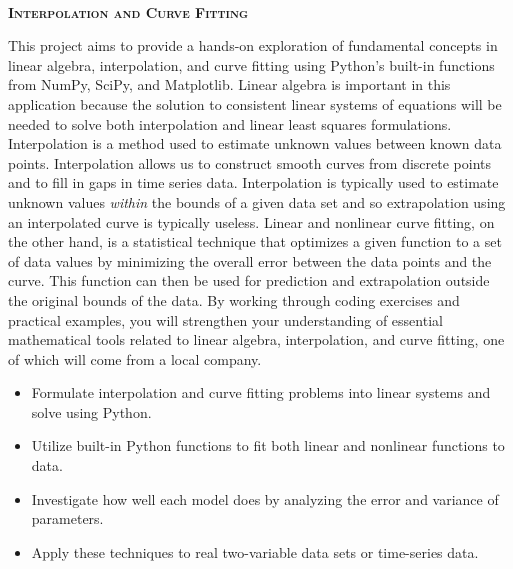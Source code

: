 \documentclass[article, 11pt]{article}
\begin{document}
\begin{center}\\
\Huge{\textbf{\textsc{ Interpolation and Curve Fitting }}} \\ \end{center}

\vspace{.6cm}

\noindent {}

\vspace{-.35cm}
\noindent \hrulefill

This project aims to provide a hands-on exploration of fundamental concepts in linear algebra, interpolation, and curve fitting using Python's built-in functions from NumPy, SciPy, and Matplotlib.  Linear algebra is important in this application because the solution to consistent linear systems of equations will be needed to solve both interpolation and linear least squares formulations.  Interpolation is a method used to estimate unknown values between known data points.  Interpolation allows us to construct smooth curves from discrete points and to fill in gaps in time series data.  Interpolation is typically used to estimate unknown values \textit{within} the bounds of a given data set and so extrapolation using an interpolated curve is typically useless.  Linear and nonlinear curve fitting, on the other hand, is a statistical technique that optimizes a given function to a set of data values by minimizing the overall error between the data points and the curve.  This function can then be used for prediction and extrapolation outside the original bounds of the data.  By working through coding exercises and practical examples, you will strengthen your understanding of essential mathematical tools related to linear algebra, interpolation, and curve fitting, one of which will come from a local company.  \\


\noindent {}

\vspace{-.35cm}
\noindent \hrulefill

\begin{itemize}
	\item Formulate interpolation and curve fitting problems into linear systems and solve using Python.
	\item Utilize built-in Python functions to fit both linear and nonlinear functions to data. 
	\item Investigate how well each model does by analyzing the error and variance of parameters.  
	\item Apply these techniques to real two-variable data sets or time-series data. 
\end{itemize}
\end{document}
